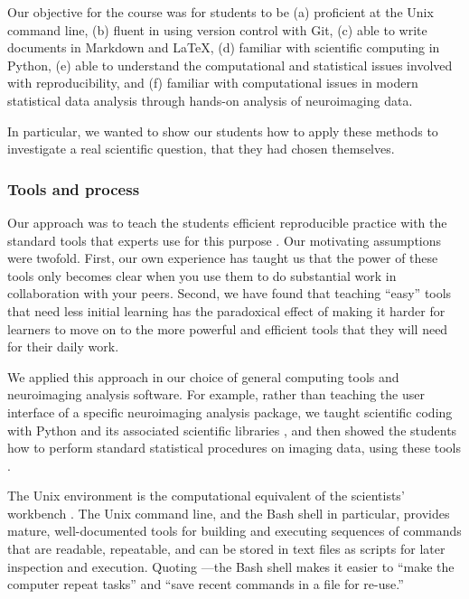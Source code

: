 Our objective for the course was for students to be
(a) proficient at the Unix command line,
(b) fluent in using version control with Git,
(c) able to write documents in Markdown and \LaTeX,
(d) familiar with scientific computing in Python,
(e) able to understand the computational and statistical issues involved with
reproducibility, and
(f) familiar with computational issues in modern statistical data
analysis through hands-on analysis of neuroimaging data.

In particular, we wanted to show our students how to apply these methods to
investigate a real scientific question, that they had chosen themselves.

\subsubsection{Tools and process}

Our approach was to teach the students efficient reproducible practice with
the standard tools that experts use for this purpose
\citep{millman2014developing}. Our motivating assumptions were twofold.
First, our own experience has taught us that the power of these tools only
becomes clear when you use them to do substantial work in collaboration with
your peers.  Second, we have found that teaching ``easy'' tools that need less
initial learning has the paradoxical effect of making it harder for learners
to move on to the more powerful and efficient tools that they will need for
their daily work.

We applied this approach in our choice of general computing tools and
neuroimaging analysis software.   For example, rather than teaching the user
interface of a specific neuroimaging analysis package, we taught scientific
coding with Python and its associated scientific libraries
\citep{millman2011python, perez2011python}, and then showed the students how to
perform standard statistical procedures on imaging data, using these tools
\citep{millman2007analysis}.

The Unix environment is the computational equivalent of the scientists'
workbench \citep{preeyanon2014reproducible}.  The Unix command line, and the
Bash shell in particular, provides mature, well-documented tools for building
and executing sequences of commands that are readable, repeatable, and can be
stored in text files as scripts for later inspection and execution.  Quoting
\cite{wilson2014best}---the Bash shell makes it easier to ``make the computer
repeat tasks'' and ``save recent commands in a file for re-use.''


